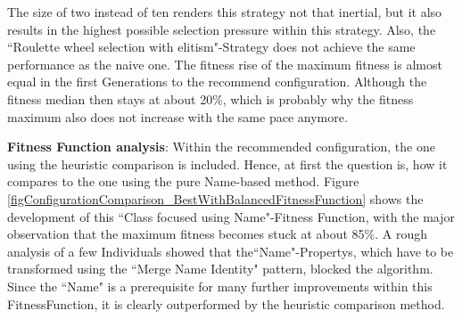 The size of two instead of ten renders this strategy not that inertial, but it also results in the highest possible selection pressure within this strategy. Also, the ``Roulette wheel selection with elitism"-Strategy does not achieve the same performance as the naive one. The fitness rise of the maximum fitness is almost equal in the first \glspl{Generation} to the recommend configuration. Although the fitness median then stays at about 20\%, which is probably why the fitness maximum also does not increase with the same pace anymore.
 
\textbf{Fitness Function analysis}: Within the recommended configuration, the one using the heuristic comparison is included. Hence, at first the question is, how it compares to the one using the pure Name-based method. Figure \ref{figConfigurationComparison_BestWithBalancedFitnessFunction} shows the development of this ``Class focused using Name"-Fitness Function, with the major observation that the maximum fitness becomes stuck at about 85\%. A rough analysis of a few \glspl{Individual} showed that the``Name"-\glspl{Property}, which have to be transformed using the ``Merge Name Identity" pattern, blocked the algorithm. Since the ``Name" is a prerequisite for many further improvements within this \gls{FitnessFunction}, it is clearly outperformed by the heuristic comparison method.

